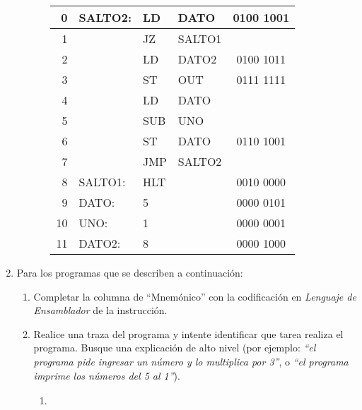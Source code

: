 \documentclass[12pt]{article}
\begin{document}
\begin{enumerate}
\begin{enumerate}
\begin{enumerate}
\begin{tabular}{r||l|l|l||c}
                    0 & SALTO2: & LD & DATO & 0100 1001\\ \hline
                    1 &  & JZ & SALTO1 & \\ \hline
                    2 &  & LD & DATO2 & 0100 1011\\ \hline
                    3 &  & ST & OUT & 0111 1111\\ \hline
                    4 &  & LD & DATO & \\ \hline
                    5 &  & SUB & UNO & \\ \hline
                    6 &  & ST & DATO & 0110 1001\\ \hline
                    7 &  & JMP & SALTO2  & \\ \hline
                    8 & SALTO1: & HLT &  & 0010 0000\\ \hline
                    9 & DATO: & 5 &  & 0000 0101\\ \hline
                    10 & UNO: & 1 &  & 0000 0001\\ \hline
                    11 & DATO2: & 8 &  & 0000 1000\\

                \end{tabular}

            \end{enumerate}
        \end{enumerate}

    \item Para los programas que se describen a continuación:

        \begin{enumerate}

            \item Completar la columna de ``Mnemónico'' con la codificación en
                \emph{Lenguaje de Ensamblador} de la instrucción.

            \item Realice una traza del programa y intente identificar que
                tarea realiza el programa. Busque una explicación de alto
                nivel (por ejemplo: \emph{``el programa pide ingresar un número y lo
                multiplica por 3''}, o \emph{``el programa imprime los números del 5
                al 1''}).

            \begin{enumerate}
            \itemsep2em \parskip0pt 

                \item \begin{tabular}{r||c||l|l|l}


\end{tabular}
\end{enumerate}
\end{enumerate}
\end{enumerate}
\end{document}
